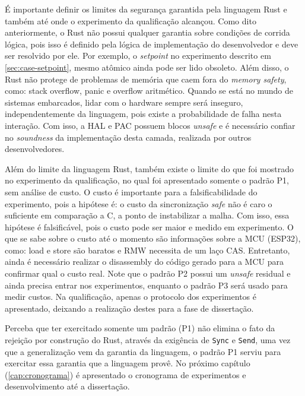 É importante definir os limites da segurança garantida pela linguagem Rust e também até onde o experimento da qualificação alcançou. Como dito anteriormente, o Rust não possui qualquer garantia sobre condições de corrida lógica, pois isso é definido pela lógica de implementação do desenvolvedor e deve ser resolvido por ele. Por exemplo, o \textit{setpoint} no experimento descrito em \ref{sec:case-setpoint}, mesmo atômico ainda pode ser lido obsoleto. Além disso, o Rust não protege de problemas de memória que caem fora do \textit{memory safety}, como: stack overflow, panic e overflow aritmético. Quando se está no mundo de sistemas embarcados, lidar com o hardware sempre será inseguro, independentemente da linguagem, pois existe a probabilidade de falha nesta interação. Com isso, a \ac{HAL} e \ac{PAC} possuem blocos \textit{unsafe} e é necessário confiar no \textit{soundness} da implementação desta camada, realizada por outros desenvolvedores.

Além do limite da linguagem Rust, também existe o limite do que foi mostrado no experimento da qualificação, no qual foi apresentado somente o padrão P1, sem análise de custo. O custo é importante para a falsificabilidade do experimento, pois a hipótese é: o custo da sincronização \textit{safe} não é caro o suficiente em comparação a C, a ponto de instabilizar a malha. Com isso, essa hipótese é falsificável, pois o custo pode ser maior e medido em experimento. O que se sabe sobre o custo até o momento são informações sobre a \ac{MCU} (ESP32), como: load e store são baratos e \ac{RMW} necessita de um laço \ac{CAS}. Entretanto, ainda é necessário realizar o disassembly do código gerado para a \ac{MCU} para confirmar qual o custo real. Note que o padrão P2 possui um \textit{unsafe} residual e ainda precisa entrar nos experimentos, enquanto o padrão P3 será usado para medir custos. Na qualificação, apenas o protocolo dos experimentos é apresentado, deixando a realização destes para a fase de dissertação.

Perceba que ter exercitado somente um padrão (P1) não elimina o fato da rejeição por construção do Rust, através da exigência de \texttt{Sync} e \texttt{Send}, uma vez que a generalização vem da garantia da linguagem, o padrão P1 serviu para exercitar essa garantia que a linguagem provê. No próximo capítulo (\ref{cap:cronograma}) é apresentado o cronograma de experimentos e desenvolvimento até a dissertação.
